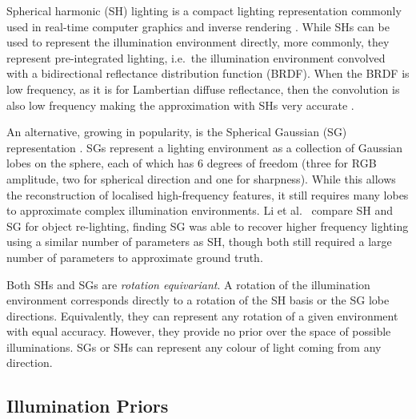 Spherical harmonic (SH) lighting \cite{basri_lambertian_2003,ramamoorthi_efficient_2001} is a compact lighting representation commonly used in real-time computer graphics \cite{ramamoorthi_efficient_2001, green_spherical_2003, sloan_precomputed_2002} and inverse rendering \cite{yu_outdoor_2021, tsai_all-frequency_2006, li_inverse_2020, rudnev_nerf_2022, egger_occlusion-aware_2018}. While SHs can be used to represent the illumination environment directly, more commonly, they represent pre-integrated lighting, i.e.~the illumination environment convolved with a bidirectional reflectance distribution function (BRDF). When the BRDF is low frequency, as it is for Lambertian diffuse reflectance, then the convolution is also low frequency making the approximation with SHs very accurate \cite{basri_lambertian_2003}. 

An alternative, growing in popularity, is the Spherical Gaussian (SG) representation \cite{wang_all-frequency_2009, tsai_all-frequency_2006, zhang_physg_2021}. SGs represent a lighting environment as a collection of Gaussian lobes on the sphere, each of which has 6 degrees of freedom (three for RGB amplitude, two for spherical direction and one for sharpness). While this allows the reconstruction of localised high-frequency features, it still requires many lobes to approximate complex illumination environments. Li et al.~\cite{li_inverse_2020} compare SH and SG for object re-lighting, finding SG was able to recover higher frequency lighting using a similar number of parameters as SH, though both still required a large number of parameters to approximate ground truth.

Both SHs and SGs are \emph{rotation equivariant}. A rotation of the illumination environment corresponds directly to a rotation of the SH basis or the SG lobe directions. Equivalently, they can represent any rotation of a given environment with equal accuracy. However, they provide no prior over the space of possible illuminations. SGs or SHs can represent any colour of light coming from any direction.

\subsection{Illumination Priors} 

